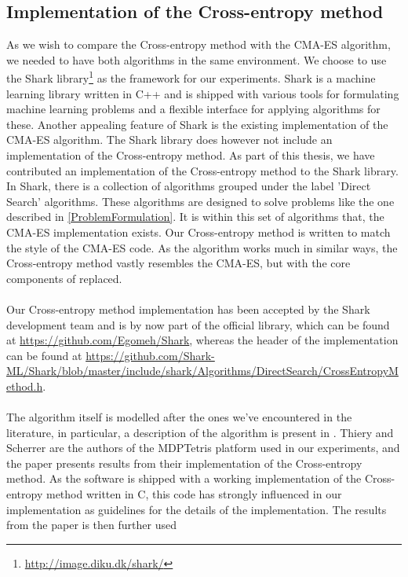 \subsection{Implementation of the Cross-entropy method}

As we wish to compare the Cross-entropy method 
with the CMA-ES algorithm, we needed to have both algorithms
in the same environment. We choose to use the Shark 
library\footnote{\url{http://image.diku.dk/shark/}}
as the framework for our experiments. Shark is a machine 
learning library written in C++ and is shipped with various tools
for formulating machine learning problems and a flexible 
interface for applying algorithms for these. Another appealing
feature of Shark is the existing implementation of the CMA-ES algorithm.
The Shark library does however not include an implementation of
the Cross-entropy method. As part of this thesis, we have contributed
an implementation of the Cross-entropy method to the Shark library.
In Shark, there is a collection of algorithms grouped under the label
'Direct Search' algorithms. These algorithms are designed to solve 
problems like the one described in \ref{ProblemFormulation}. It is within this set of algorithms that, 
the CMA-ES implementation exists. Our Cross-entropy method 
is written to match the style of the CMA-ES code. As the algorithm
works much in similar ways, the Cross-entropy method vastly resembles the CMA-ES, 
but with the core components of replaced.\\
\\
Our Cross-entropy method implementation has been accepted by the Shark development team and is 
by now part of the official library, which can be found at 
\url{https://github.com/Egomeh/Shark}, whereas the header of the 
implementation can be found at 
\url{https://github.com/Shark-ML/Shark/blob/master/include/shark/Algorithms/DirectSearch/CrossEntropyMethod.h}.\\
\\
The algorithm itself is modelled after the ones we've encountered 
in the literature, in particular, a description of the algorithm is 
present in \citep{thiery:09}. Thiery and Scherrer are the authors of the 
MDPTetris platform used in our experiments, and the paper presents 
results from their implementation of the Cross-entropy method. As the 
software is shipped with a working implementation of the Cross-entropy method written in C,
this code has strongly influenced in our implementation as guidelines for
the details of the implementation. The results from the paper is then further used

